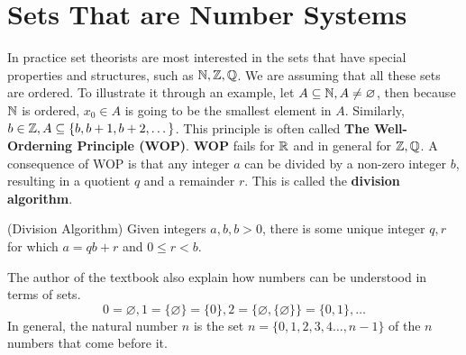 
\section{Sets That are Number Systems}

In practice set theorists are most interested in the sets that have special properties and structures, such as $\mathbb{N},\mathbb{Z},\mathbb{Q}$. We are assuming that all these sets are ordered. To illustrate it through an example, let $A\subseteq \mathbb{N},A\ne \varnothing$, then because $\mathbb{N}$ is ordered, $x_{0}\in A$ is going to be the smallest element in $A$. Similarly, $b\in\mathbb{Z},A\subseteq \{ b,b+1,b+2,\dots \}$. This principle is often called \textbf{The Well-Orderning Principle (WOP)}.\newline
\textbf{WOP} fails for $\mathbb{R}$ and in general for $\mathbb{Z},\mathbb{Q}$.\newline
A consequence of WOP is that any integer $a$ can be divided by a non-zero integer $b$, resulting in a quotient $q$ and a remainder $r$. This is called the \textbf{division algorithm}.
\begin{fact}
    (Division Algorithm) Given integers $a,b, b>0$, there is some unique integer $q,r$ for which $a=qb+r$ and $0\le r<b$. 
\end{fact}

The author of the textbook also explain how numbers can be understood in terms of sets. 
$$
0=\varnothing,1=\{ \varnothing \}=\{ 0 \},2=\{ \varnothing,\{ \varnothing \} \}=\{ 0,1 \},\dots
$$
In general, the natural number $n$ is the set $n=\{ 0,1,2,3,4\dots, n-1 \}$ of the $n$ numbers that come before it. 
